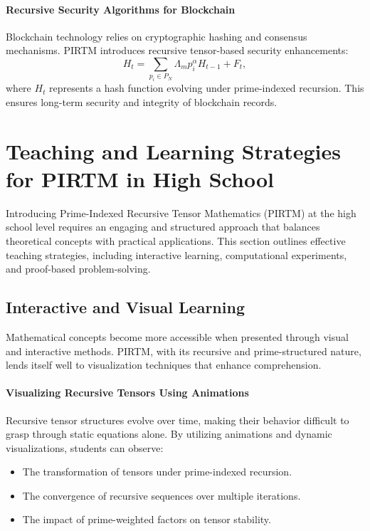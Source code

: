 \documentclass{article}
\theoremstyle{plain}
\begin{document}
\paragraph{Recursive Security Algorithms for Blockchain}
Blockchain technology relies on cryptographic hashing and consensus mechanisms. PIRTM introduces recursive tensor-based security enhancements:
\begin{equation}
    H_t = \sum_{p_i \in P_N} \Lambda_m p_i^\alpha H_{t-1} + F_t,
\end{equation}
where \( H_t \) represents a hash function evolving under prime-indexed recursion. This ensures long-term security and integrity of blockchain records.

\section{Teaching and Learning Strategies for PIRTM in High School}

Introducing Prime-Indexed Recursive Tensor Mathematics (PIRTM) at the high school level requires an engaging and structured approach that balances theoretical concepts with practical applications. This section outlines effective teaching strategies, including interactive learning, computational experiments, and proof-based problem-solving.

\subsection{Interactive and Visual Learning}

Mathematical concepts become more accessible when presented through visual and interactive methods. PIRTM, with its recursive and prime-structured nature, lends itself well to visualization techniques that enhance comprehension.

\paragraph{Visualizing Recursive Tensors Using Animations}
Recursive tensor structures evolve over time, making their behavior difficult to grasp through static equations alone. By utilizing animations and dynamic visualizations, students can observe:
\begin{itemize}
    \item The transformation of tensors under prime-indexed recursion.
    \item The convergence of recursive sequences over multiple iterations.
    \item The impact of prime-weighted factors on tensor stability.
\end{itemize}
\end{document}
